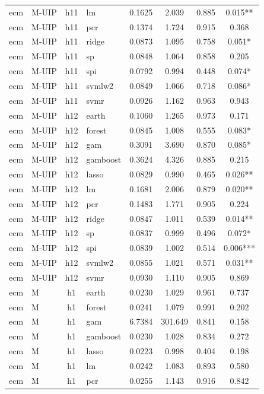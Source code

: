 \begin{ThreePartTable}
\begin{longtable}[t]{llclcccc}
ecm & M-UIP & h11 & lm & 0.1625 & 2.039 & 0.885 & 0.015**\\
ecm & M-UIP & h11 & pcr & 0.1374 & 1.724 & 0.915 & 0.368\\
ecm & M-UIP & h11 & ridge & 0.0873 & 1.095 & 0.758 & 0.051*\\
ecm & M-UIP & h11 & sp & 0.0848 & 1.064 & 0.858 & 0.205\\
ecm & M-UIP & h11 & spi & 0.0792 & 0.994 & 0.448 & 0.074*\\
ecm & M-UIP & h11 & svmlw2 & 0.0849 & 1.066 & 0.718 & 0.086*\\
ecm & M-UIP & h11 & svmr & 0.0926 & 1.162 & 0.963 & 0.943\\
\addlinespace
ecm & M-UIP & h12 & earth & 0.1060 & 1.265 & 0.973 & 0.171\\
ecm & M-UIP & h12 & forest & 0.0845 & 1.008 & 0.555 & 0.083*\\
ecm & M-UIP & h12 & gam & 0.3091 & 3.690 & 0.870 & 0.085*\\
ecm & M-UIP & h12 & gamboost & 0.3624 & 4.326 & 0.885 & 0.215\\
ecm & M-UIP & h12 & lasso & 0.0829 & 0.990 & 0.465 & 0.026**\\
ecm & M-UIP & h12 & lm & 0.1681 & 2.006 & 0.879 & 0.020**\\
ecm & M-UIP & h12 & pcr & 0.1483 & 1.771 & 0.905 & 0.224\\
ecm & M-UIP & h12 & ridge & 0.0847 & 1.011 & 0.539 & 0.014**\\
ecm & M-UIP & h12 & sp & 0.0837 & 0.999 & 0.496 & 0.072*\\
ecm & M-UIP & h12 & spi & 0.0839 & 1.002 & 0.514 & 0.006***\\
ecm & M-UIP & h12 & svmlw2 & 0.0855 & 1.021 & 0.571 & 0.031**\\
ecm & M-UIP & h12 & svmr & 0.0930 & 1.110 & 0.905 & 0.869\\
\addlinespace
ecm & M & h1 & earth & 0.0230 & 1.029 & 0.961 & 0.737\\
ecm & M & h1 & forest & 0.0241 & 1.079 & 0.991 & 0.202\\
ecm & M & h1 & gam & 6.7384 & 301.649 & 0.841 & 0.158\\
ecm & M & h1 & gamboost & 0.0230 & 1.028 & 0.834 & 0.272\\
ecm & M & h1 & lasso & 0.0223 & 0.998 & 0.404 & 0.198\\
ecm & M & h1 & lm & 0.0242 & 1.083 & 0.893 & 0.580\\
ecm & M & h1 & pcr & 0.0255 & 1.143 & 0.916 & 0.842\\

\end{longtable}
\end{ThreePartTable}
